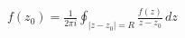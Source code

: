 \documentclass[preview]{standalone}
\begin{document}
\begin{center}
$f(z_0)=\frac{1}{2\pi i}\oint_{|z-z_0|=R}\frac{f(z)}{z-z_0}\,dz$
\end{center}
\end{document}
